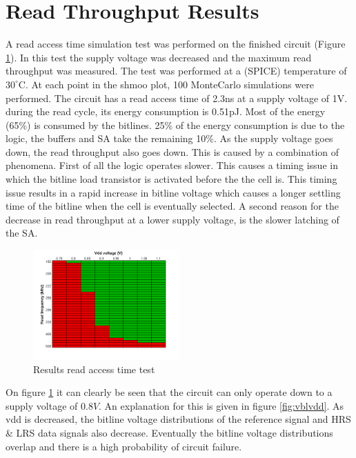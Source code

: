 \documentclass[journal]{IEEEtran}
\begin{document}
\section{Read Throughput Results}
A read access time simulation test was performed on the finished circuit (Figure \ref{fig:speedvdd}). In this test the supply voltage was decreased and the maximum read throughput was measured. The test was performed at a (SPICE) temperature of $30^{\circ}\mathrm{C}$. At each point in the shmoo plot, 100 MonteCarlo simulations were performed. The circuit has a read access time of 2.3ns at a supply voltage of 1V. during the read cycle, its energy consumption is 0.51pJ. Most of the energy (65\%) is consumed by the bitlines. 25\% of the energy consumption is due to the logic, the buffers and SA take the remaining 10\%. As the supply voltage goes down, the read throughput also goes down. This is caused by a combination of phenomena. First of all the logic operates slower. This causes a timing issue in which the bitline load transistor is activated before the the cell is. This timing issue results in a rapid increase in bitline voltage which causes a longer settling time of the bitline when the cell is eventually selected. A second reason for the decrease in read throughput at a lower supply voltage, is the slower latching of the SA.

\begin{figure}[h!t]
  \centering
  \includegraphics[width=0.5\textwidth]{../fig/hfdst-final-vddspeed.png}
  \caption{Results read access time test}
  \label{fig:speedvdd}
\end{figure}

On figure \ref{fig:speedvdd} it can clearly be seen that the circuit can only operate down to a supply voltage of $0.8V$. An explanation for this is given in figure \ref{fig:vblvdd}. As vdd is decreased, the bitline voltage distributions of the reference signal and HRS \& LRS data signals also decrease. Eventually the bitline voltage distributions overlap and there is a high probability of circuit failure.
\end{document}
